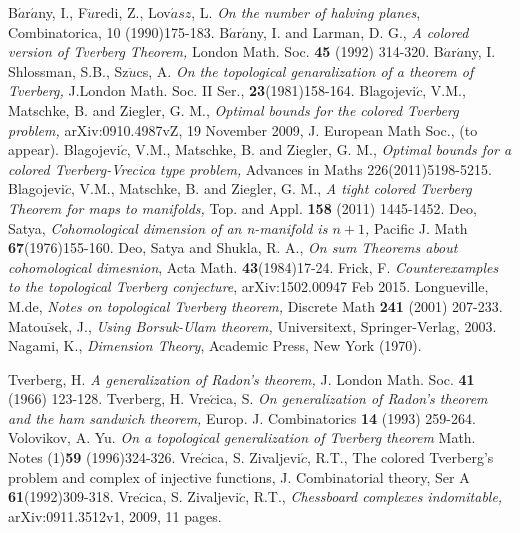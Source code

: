 \documentclass[11pt]{amsart}
\begin{document}
\begin{thebibliography}{99}

 B$\acute{a}$r$\acute{a}$ny, I., F$\ddot{u}$redi, Z., Lov$\acute{a}sz$, L. {\it On the number of halving planes}, Combinatorica, 10 (1990)175-183.
 B$\acute{a}$r$\acute{a}$ny, I. and Larman, D. G., {\it A colored version of Tverberg Theorem,} London Math. Soc. {\bf 45} (1992) 314-320.
 B$\acute{a}$r$\acute{a}$ny, I. Shlossman, S.B., Sz$\ddot{u}$cs, A. {\it On the topological genaralization of a theorem of Tverberg,} J.London Math. Soc. II Ser., {\bf 23}(1981)158-164.
 Blagojevi$\acute{c}$, V.M., Matschke, B. and Ziegler, G. M., {\it Optimal bounds for the colored Tverberg problem,} arXiv:0910.4987vZ, 19 November 2009, J. European Math Soc., (to appear).
 Blagojevi$\acute{c}$, V.M., Matschke, B. and Ziegler, G. M., {\it Optimal bounds for a colored Tverberg-Vrecica type problem,} Advances in Maths 226(2011)5198-5215.
 Blagojevi$\acute{c}$, V.M., Matschke, B. and Ziegler, G. M., {\it A tight colored Tverberg  Theorem for maps to manifolds,}  Top. and Appl. {\bf 158} (2011) 1445-1452.
 Deo, Satya, {\it Cohomological dimension of an n-manifold is $n+1$,} Pacific J. Math {\bf 67}(1976)155-160.
 Deo, Satya and Shukla, R. A., {\it On sum Theorems about cohomological dimesnion},  Acta Math. {\bf 43}(1984)17-24.
 Frick, F. {\it Counterexamples to the topological Tverberg conjecture}, arXiv:1502.00947 Feb 2015.
 Longueville, M.de, {\it Notes on topological Tverberg theorem,} Discrete Math {\bf 241} (2001) 207-233.
 Matou$\breve{s}$ek, J., {\it Using Borsuk-Ulam theorem, } Universitext, Springer-Verlag, 2003.
  Nagami, K., {\it Dimension Theory},  Academic Press, New York (1970).

 Tverberg, H. {\it A generalization of Radon's theorem,} J. London Math. Soc. {\bf 41} (1966) 123-128.
 Tverberg, H. Vre$\acute{c}$ica, S. {\it On generalization of Radon's theorem and the ham sandwich theorem,} Europ. J. Combinatorics {\bf 14} (1993) 259-264.
 Volovikov, A. Yu. {\it On a topological generalization of Tverberg theorem} Math. Notes (1){\bf 59} (1996)324-326.
Vre$\acute{c}$ica, S. Zivaljevi$\acute{c}$, R.T., {The colored Tverberg's problem and complex of injective functions,} J. Combinatorial theory, Ser A {\bf 61}(1992)309-318.
Vre$\acute{c}$ica, S. Zivaljevi$\acute{c}$, R.T., {\it Chessboard complexes indomitable,} arXiv:0911.3512v1, 2009, 11 pages.

\end{thebibliography}
\end{document}
